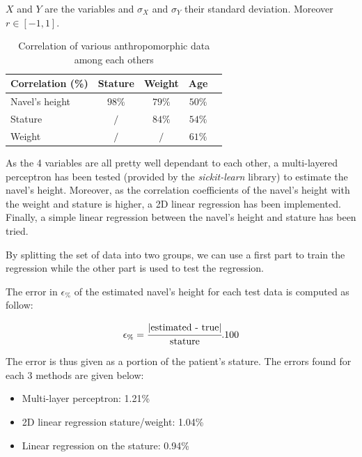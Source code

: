 \documentclass{article}
\newcommand{\vsp}{\vspace{\baselineskip}}
\begin{document}
$X$ and $Y$ are the variables and $\sigma_X$ and $\sigma_Y$ their standard deviation. Moreover $r \in [-1,1]$.

\begin{table}[H]
    \centering
    \begin{tabular}{|l|c|c|c|c|}
        \hline 
        Correlation (\%) & Stature & Weight & Age 
        \\ \hline
        Navel's height & $98\%$ & $79\%$ & $50\%$
        \\ \hline
        Stature & $/$ & $84\%$ & $54\%$
        \\ \hline
        Weight & $/$ & $/$ & $61\%$
        \\ \hline 
    \end{tabular}
    \caption{Correlation of various anthropomorphic data among each others}
    \label{tab:correlation_various_variables}
\end{table}

As the 4 variables are all pretty well dependant to each other, a multi-layered perceptron has been tested (provided by the \textit{sickit-learn} library) to estimate the navel's height. Moreover, as the correlation coefficients of the navel's height with the weight and stature is higher, a 2D linear regression has been implemented. Finally, a simple linear regression between the navel's height and stature has been tried. 

\vsp

By splitting the set of data into two groups, we can use a first part to train the regression while the other part is used to test the regression. 
\vsp

The error in $\epsilon_\%$ of the estimated navel's height for each test data is computed as follow:

\begin{equation}
    \epsilon_\% = \cfrac{\abs{\text{estimated - true}}}{\text{stature}}.100
\end{equation}

The error is thus given as a portion of the patient's stature. The errors found for each 3 methods are given below:

\begin{itemize}
    \item Multi-layer perceptron: 1.21\% 
    \item 2D linear regression stature/weight: 1.04\% 
    \item Linear regression on the stature: 0.94\%
\end{itemize}
\end{document}
